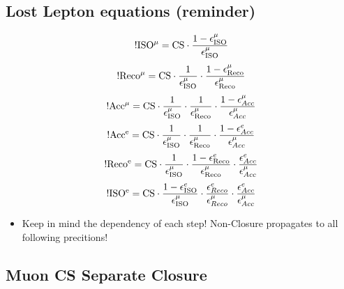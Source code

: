 \documentclass{beamer}
\begin{document}
\subsection{Lost Lepton equations (reminder)}
\begin{frame}
 \begin{equation}
 \rm !ISO^{\mu} = {\rm CS}\cdot \frac{1-\epsilon_{\rm ISO}^{\mu}}{\epsilon_{\rm ISO}^{\mu}}
\label{eq:isolation_muon}
\end{equation}
\begin{equation}
 {\rm !Reco^{\mu}} = {\rm CS}\cdot \frac{1}{\epsilon_{\rm ISO}^{\mu}} \cdot \frac{1-\epsilon_{\rm Reco}^{\mu}}{\epsilon_{\rm Reco}^{\mu}}
\label{eq:reconstruction_muon}
\end{equation}
\begin{equation}
 {\rm !Acc^{\mu}} = {\rm CS}\cdot \frac{1}{\epsilon_{\rm ISO}^{\mu}}\cdot \frac{1}{\epsilon_{\rm Reco}^{\mu}} \cdot \frac{1-\epsilon^{\mu}_{Acc}}{\epsilon^{\mu}_{Acc}}
\label{eq:acceptance_muon}
\end{equation}
\begin{equation}
{\rm !Acc^{e}} = {\rm CS}\cdot \frac{1}{\epsilon_{\rm ISO}^{\mu}}\cdot \frac{1}{\epsilon_{\rm Reco}^{\mu}}  \cdot \frac{1 - \epsilon^{e}_{Acc}}{\epsilon^{\mu}_{Acc}}
 \label{eq:elec_acc}
\end{equation}
\begin{equation}
{\rm !Reco^{e}} = {\rm CS}\cdot \frac{1}{\epsilon_{\rm ISO}^{\mu}}\cdot \frac{1-\epsilon_{\rm Reco}^{e}}{\epsilon_{\rm Reco}^{\mu}}  \cdot \frac{\epsilon^{e}_{Acc}}{\epsilon^{\mu}_{Acc}}
 \label{eq:elec_reco}
\end{equation}
\begin{equation}
{\rm !ISO^{e}} = {\rm CS}\cdot \frac{1-\epsilon_{\rm ISO}^{e}}{\epsilon_{\rm ISO}^{\mu}} \cdot \frac{\epsilon^{e}_{Reco}}{\epsilon^{\mu}_{Reco}} \cdot \frac{\epsilon^{e}_{Acc}}{\epsilon^{\mu}_{Acc}}
\label{eq:elec_iso}
\end{equation}
\begin{itemize}
 \item Keep in mind the dependency of each step! Non-Closure propagates to all following precitions!
\end{itemize}

\end{frame}
\subsection{Muon CS Separate Closure}
\end{document}

